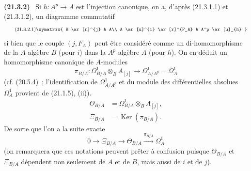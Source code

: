 \documentclass[10pt,oneside]{book}
\makeatletter
\newcommand{\setmanualcurrentlabel}[1]{\def\@currentlabel{#1}}
\newcommand{\oldpage}[2][]{%
  \setcounter{footnote}{0}%
  \marginpar{\scriptsize\textbf{#1}~|~#2}\ignorespaces}
\newenvironment{env}[1][]{\setmanualcurrentlabel{#1}\par\medskip\noindent\textbf{(#1)}\ }{\par}
\makeatother
\begin{document}
\begin{env}[21.3.2]
\label{0.21.3.2-fr}
Si $h:A^p\to A$ est l'injection canonique, on a, d'après (21.3.1.1) et
(21.3.1.2), un diagramme commutatif
\begin{equation}
\tag{21.3.2.1}\label{0.21.3.2.1-fr}
\xymatrix{
 B \ar[r]^{j} & A\\
 A \ar[u]^{i} \ar[r]^{F_A} & A^p \ar[u]_{h}
}
\end{equation}
si bien que le couple $(j,F_A)$ peut être considéré comme un di-homomorphisme
de la $A$-algèbre $B$ (pour $i$) dans la $A^p$-algèbre $A$ (pour $h$).
On en déduit un homomorphisme canonique de $A$-modules
\begin{equation}
\tag{21.3.2.2}\label{0.21.3.2.2-fr}
\pi_{B/A}:\Omega^1_{B/A}\otimes_B A_{[j]}\longrightarrow
\Omega^1_{A/A^p}=\Omega^1_A
\end{equation}
(cf. (20.5.4)~; l'identification de $\Omega^1_{A/A^p}$ et du module des
différentielles absolues $\Omega^1_A$ provient de (21.1.5), (ii)).
\begin{align}
\tag{21.3.2.3}\label{0.21.3.2.3-fr}
\Theta_{B/A}&=\Omega^1_{B/A}\otimes_B A_{[j]},\\
\tag{21.3.2.4}\label{0.21.3.2.4-fr}
\Xi_{B/A}&=\operatorname{Ker}(\pi_{B/A}).
\end{align}
\oldpage[0\textsubscript{IV-1}]{161}
De sorte que l'on a la suite exacte
\begin{equation}
\tag{21.3.2.5}\label{0.21.3.2.5-fr}
0\to\Xi_{B/A}\to\Theta_{B/A}\xrightarrow{\pi_{B/A}}\Omega^1_A
\end{equation}
(on remarquera que ces notations peuvent prêter à confusion puisque
$\Theta_{B/A}$ et $\Xi_{B/A}$ dépendent non seulement de $A$ et de $B$,
mais aussi de $i$ et de $j$).
\end{env}
\end{document}
